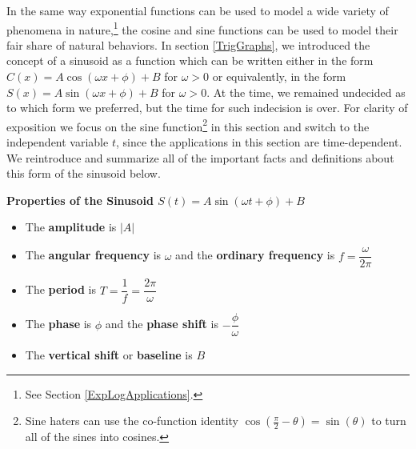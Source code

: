 

\setcounter{footnote}{0}

\label{Sinusoid}

In the same way exponential functions can be used to model a wide variety of phenomena in nature,\footnote{See Section \ref{ExpLogApplications}.} the cosine and sine functions can be used to model their fair share of natural behaviors. In section \ref{TrigGraphs}, we introduced the concept of a sinusoid as a function which can be written either in the form $C(x) = A \cos(\omega x + \phi) + B$ for $\omega > 0$ or equivalently, in the form $S(x) = A \sin(\omega x + \phi) + B$ for $\omega > 0$.  At the time, we remained undecided as to which form we preferred, but the time for such indecision is over.  For clarity of exposition we focus on the sine function\footnote{Sine haters can use the co-function identity $\cos\left(\frac{\pi}{2} - \theta\right) = \sin(\theta)$ to turn all of the sines into cosines.} in this section and switch to the independent variable $t$, since the applications in this section are time-dependent.  We reintroduce and summarize all of the important facts and definitions about this form of the sinusoid below.

\smallskip

\colorbox{ResultColor}{\bbm

\label{sinesinusoidprops}

\centerline{\textbf{Properties of the Sinusoid \boldmath  $S(t) = A \sin(\omega t + \phi) + B$}} 

\begin{itemize}

\item  The \textbf{amplitude} is $|A|$

\item  The \textbf{angular frequency} is $\omega$ and the \textbf{ordinary frequency} is $f  = \dfrac{\omega}{2\pi}$

\item  The \textbf{period} is  $T = \dfrac{1}{f} = \dfrac{2\pi}{\omega}$

\item  The \textbf{phase} is $\phi$ and the \textbf{phase shift} is $-\dfrac{\phi}{\omega}$

\item  The \textbf{vertical shift} or \textbf{baseline} is $B$

\end{itemize}

\ebm}

